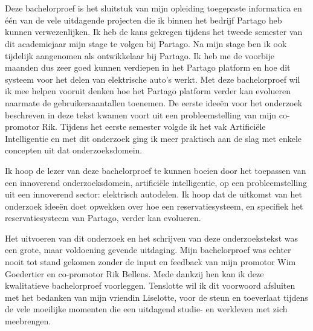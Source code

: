 
\chapter*{}
\label{ch:voorwoord}

Deze bachelorproef is het sluitstuk van mijn opleiding toegepaste informatica en één van de vele uitdagende projecten die ik binnen het bedrijf Partago heb kunnen verwezenlijken. Ik heb de kans gekregen tijdens het tweede semester van dit academiejaar mijn stage te volgen bij Partago. Na mijn stage ben ik ook tijdelijk aangenomen als ontwikkelaar bij Partago. Ik heb me de voorbije maanden dus zeer goed kunnen verdiepen in het Partago platform en hoe dit systeem voor het delen van elektrische auto's werkt. Met deze bachelorproef wil ik mee helpen vooruit denken hoe het Partago platform verder kan evolueren naarmate de gebruikersaantallen toenemen. De eerste ideeën voor het onderzoek beschreven in deze tekst kwamen voort uit een probleemstelling van mijn co-promotor Rik. Tijdens het eerste semester volgde ik het vak Artificiële Intelligentie en met dit onderzoek ging ik meer praktisch aan de slag met enkele concepten uit dat onderzoeksdomein.

Ik hoop de lezer van deze bachelorproef te kunnen boeien door het toepassen van een innoverend onderzoeksdomein, artificiële intelligentie, op een probleemstelling uit een innoverend sector: elektrisch autodelen. Ik hoop dat de uitkomst van het onderzoek ideeën doet opwekken over hoe een reservatiesysteem, en specifiek het reservatiesysteem van Partago, verder kan evolueren.  
 
Het uitvoeren van dit onderzoek en het schrijven van deze onderzoekstekst was een grote, maar voldoening gevende uitdaging. Mijn bachelorproef was echter nooit tot stand gekomen zonder de input en feedback van mijn promotor Wim Goedertier en co-promotor Rik Bellens. Mede dankzij hen kan ik deze kwalitatieve bachelorproef voorleggen. Tenslotte wil ik dit voorwoord afsluiten met het bedanken van mijn vriendin Liselotte, voor de steun en toeverlaat tijdens de vele moeilijke momenten die een uitdagend studie- en werkleven met zich meebrengen.


